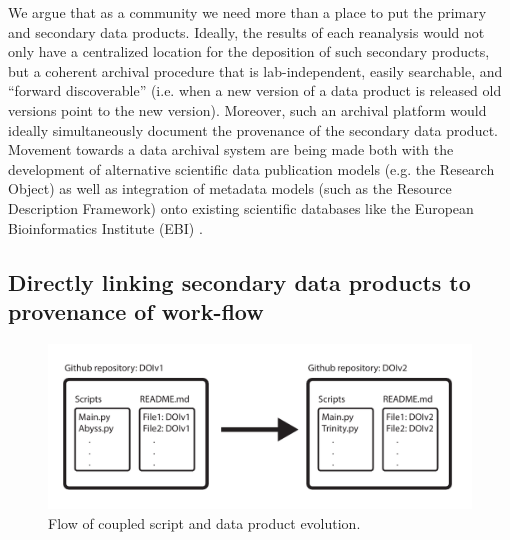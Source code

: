 \documentclass[12pt]{article}
\begin{document}
We argue that as a community we need more than a place to put the primary and secondary data products. Ideally, the results of each reanalysis would not only have a centralized location for the deposition of such secondary products, but a coherent archival procedure that is lab-independent, easily searchable, and ``forward discoverable'' (i.e. when a  new version of a data product is released old versions point to the new version). Moreover, such an archival platform would ideally simultaneously document the provenance of the secondary data product. Movement towards a data archival system are being made both with the development of alternative scientific data publication models (e.g. the Research Object\cite{Bechhofer2013}) as well as integration of metadata models (such as the Resource Description Framework) onto existing scientific databases like the European Bioinformatics Institute (EBI) \cite{Callahan2013}.

\subsection{Directly linking secondary data products to provenance of work-flow}

\begin{figure}[h!]
  \centering
  \includegraphics[width=12cm]{Diagram.pdf}
  \caption{Flow of coupled script and data product evolution.}
  \label{FlowDiagram}
\end{figure}
\end{document}
